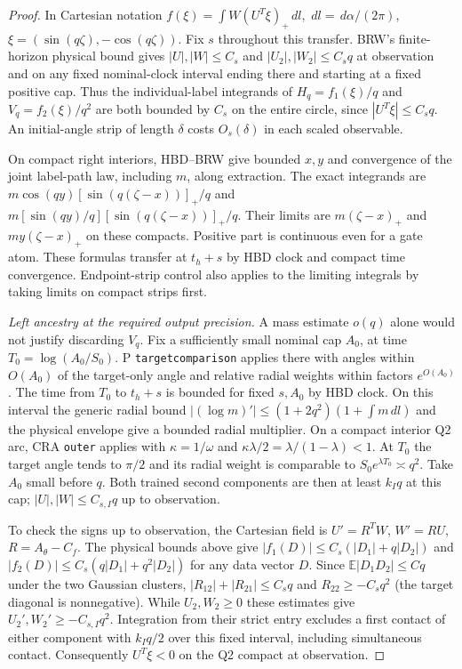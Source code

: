 \documentclass[11pt]{article}
\newcommand{\dd}{\,d}
\begin{document}
\begin{proof}
In Cartesian notation $f(\xi)=\int W(U^T\xi)_+\dd l$,
$\dd l=\dd\alpha/(2\pi)$, $\xi=(\sin(q\zeta),-\cos(q\zeta))$.
Fix $s$ throughout this transfer. BRW's finite-horizon physical
bound gives $|U|,|W|\le C_s$ and $|U_2|,|W_2|\le C_s q$ at
observation and on any fixed nominal-clock interval ending there
and starting at a fixed positive cap. Thus the individual-label
integrands of $H_q=f_1(\xi)/q$ and $V_q=f_2(\xi)/q^2$ are
both bounded by $C_s$ on the entire circle, since $|U^T\xi|\le C_s q$.
An initial-angle strip of length $\delta$ costs $O_s(\delta)$
in each scaled observable.

On compact right interiors, HBD--BRW give bounded $x,y$ and
convergence of the joint label-path law, including $m$, along extraction.
The exact integrands are $m\cos(qy)[\sin(q(\zeta-x))]_+/q$ and
$m[\sin(qy)/q][\sin(q(\zeta-x))]_+/q$.
Their limits are $m(\zeta-x)_+$ and $my(\zeta-x)_+$ on these
compacts. Positive part is continuous even for a gate atom.
These formulas transfer at $t_h+s$ by HBD clock and compact time
convergence. Endpoint-strip control also applies to the limiting
integrals by taking limits on compact strips first.

\emph{Left ancestry at the required output precision.}
A mass estimate $o(q)$ alone would not justify discarding $V_q$.
Fix a sufficiently small nominal cap $A_0$, at time
$T_0=\log(A_0/S_0)$. P \texttt{targetcomparison} applies there
with angles within $O(A_0)$ of the target-only angle and relative
radial weights within factors $e^{O(A_0)}$. The time from $T_0$ to
$t_h+s$ is bounded for fixed $s,A_0$ by HBD clock. On this interval
the generic radial bound $|(\log m)'|\le(1+2q^2)(1+\int m\dd l)$
and the physical envelope give a bounded radial multiplier.
On a compact interior Q2 arc, CRA \texttt{outer} applies with
$\kappa=1/\omega$ and $\kappa\lambda/2=\lambda/(1-\lambda)<1$.
At $T_0$ the target angle tends to $\pi/2$ and its radial weight
is comparable to $S_0e^{\lambda T_0}\asymp q^2$.
Take $A_0$ small before $q$. Both trained second components are
then at least $k_I q$ at this cap; $|U|,|W|\le C_{s,I}q$
up to observation.

To check the signs up to observation, the Cartesian field is
$U'=R^TW$, $W'=RU$, $R=A_\theta-C_f$.
The physical bounds above give $|f_1(D)|\le C_s(|D_1|+q|D_2|)$
and $|f_2(D)|\le C_s(q|D_1|+q^2|D_2|)$ for any data vector $D$.
Since $\mathbb E|D_1D_2|\le Cq$ under the two Gaussian clusters,
$|R_{12}|+|R_{21}|\le C_s q$ and $R_{22}\ge-C_s q^2$
(the target diagonal is nonnegative). While $U_2,W_2\ge0$ these
estimates give $U_2',W_2'\ge-C_{s,I}q^2$. Integration from
their strict entry excludes a first contact of either component
with $k_I q/2$ over this fixed interval, including simultaneous
contact. Consequently $U^T\xi<0$ on the Q2 compact at observation.


\end{proof}
\end{document}

